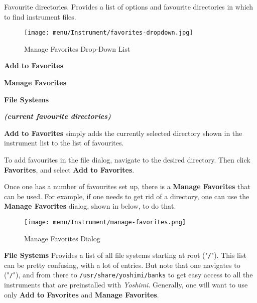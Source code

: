    Favourite directories.
   Provides a list of options and favourite directories in which to find
   instrument files.

\begin{figure}[H]
   \centering
   \texttt{[image: menu/Instrument/favorites-dropdown.jpg]}
   \caption{Manage Favorites Drop-Down List}
   \label{fig:open_instrument_favorites}
\end{figure}

   \begin{enumber}
      \item \textbf{Add to Favorites}
      \item \textbf{Manage Favorites}
      \item \textbf{File Systems}
      \item \textbf{\textsl{(current favourite directories)}}
   \end{enumber}

   \textbf{Add to Favorites}
   simply adds the currently selected directory shown in the instrument list
   to the list of favourites.

   To add favourites in the file dialog, navigate to the desired directory.
   Then click \textbf{Favorites}, and select \textbf{Add to Favorites}.

   Once one has a number of favourites set up,
   there is a \textbf{Manage Favorites} that can be used.
   For example, if one needs to get rid of a directory, one can use the
   \textbf{Manage Favorites}
   dialog, shown in
    below,
   to do that.

\begin{figure}[H]
   \centering
   \texttt{[image: menu/Instrument/manage-favorites.png]}
   \caption{Manage Favorites Dialog}
   \label{fig:manage_instrument_favorites}
\end{figure}

   \textbf{File Systems} 
   Provides a list of all file systems starting at root ("\texttt{/}").
   This list can be pretty confusing, with a lot of entries.
   But note that one navigates to ("\texttt{/}"), and from there to
   \texttt{/usr/share/yoshimi/banks} to get easy access to all the
   instruments that are preinstalled with
   \textsl{Yoshimi}.
   Generally, one will want to use only
   \textbf{Add to Favorites} and \textbf{Manage Favorites}.

